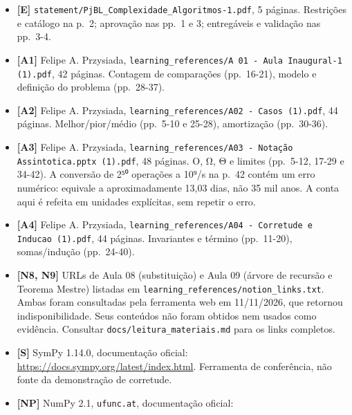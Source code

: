 \documentclass[
  brazilian,
  11pt,
  a4paper,
]{article}
\providecommand{\tightlist}{%
  \setlength{\itemsep}{0pt}\setlength{\parskip}{0pt}}
\begin{document}
\begin{itemize}
\tightlist
\item
  \textbf{{[}E{]}}
  \texttt{statement/\allowbreak{}PjBL\_\allowbreak{}Complexidade\_\allowbreak{}Algoritmos-\allowbreak{}1.\allowbreak{}pdf},
  5 páginas. Restrições e catálogo na p.~2; aprovação nas pp.~1 e 3;
  entregáveis e validação nas pp.~3-4.
\item
  \textbf{{[}A1{]}} Felipe A. Przysiada,
  \texttt{learning\_\allowbreak{}references/\allowbreak{}A 01 -\allowbreak{} Aula Inaugural-\allowbreak{}1 (1).\allowbreak{}pdf},
  42 páginas. Contagem de comparações (pp.~16-21), modelo e definição do
  problema (pp.~28-37).
\item
  \textbf{{[}A2{]}} Felipe A. Przysiada,
  \texttt{learning\_\allowbreak{}references/\allowbreak{}A02 -\allowbreak{} Casos (1).\allowbreak{}pdf},
  44 páginas. Melhor/pior/médio (pp.~5-10 e 25-28), amortização
  (pp.~30-36).
\item
  \textbf{{[}A3{]}} Felipe A. Przysiada,
  \texttt{learning\_\allowbreak{}references/\allowbreak{}A03 -\allowbreak{} Notação Assintotica.\allowbreak{}pptx (1).\allowbreak{}pdf},
  48 páginas. O, Ω, Θ e limites (pp.~5-12, 17-29 e 34-42). A conversão
  de 2⁵⁰ operações a 10⁹/s na p.~42 contém um erro numérico: equivale a
  aproximadamente 13,03 dias, não 35 mil anos. A conta aqui é refeita em
  unidades explícitas, sem repetir o erro.
\item
  \textbf{{[}A4{]}} Felipe A. Przysiada,
  \texttt{learning\_\allowbreak{}references/\allowbreak{}A04 -\allowbreak{} Corretude e Inducao (1).\allowbreak{}pdf},
  44 páginas. Invariantes e término (pp.~11-20), somas/indução
  (pp.~24-40).
\item
  \textbf{{[}N8, N9{]}} URLs de Aula 08 (substituição) e Aula 09 (árvore
  de recursão e Teorema Mestre) listadas em
  \texttt{learning\_\allowbreak{}references/\allowbreak{}notion\_\allowbreak{}links.\allowbreak{}txt}.
  Ambas foram consultadas pela ferramenta web em 11/11/2026, que
  retornou indisponibilidade. Seus conteúdos não foram obtidos nem
  usados como evidência. Consultar
  \texttt{docs/\allowbreak{}leitura\_\allowbreak{}materiais.\allowbreak{}md}
  para os links completos.
\item
  \textbf{{[}S{]}} SymPy 1.14.0, documentação oficial:
  \url{https://docs.sympy.org/latest/index.html}. Ferramenta de
  conferência, não fonte da demonstração de corretude.
\item
  \textbf{{[}NP{]}} NumPy 2.1, \texttt{ufunc.\allowbreak{}at},
  documentação oficial:

\end{itemize}
\end{document}

